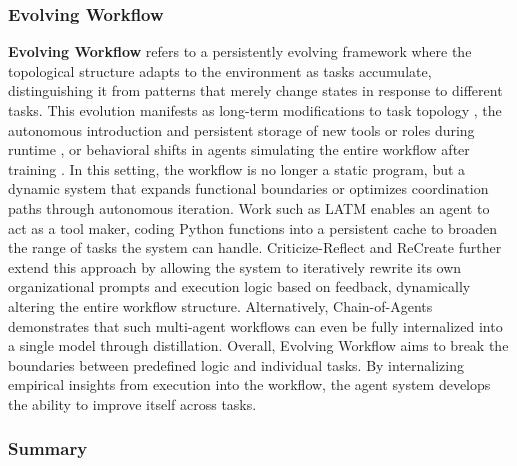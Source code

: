 \documentclass{llmxive}
\begin{document}
\subsubsection{Evolving Workflow}
\label{sec:evolving_workflow}
\textbf{Evolving Workflow} refers to a persistently evolving framework where the topological structure adapts to the environment as tasks accumulate, distinguishing it from patterns that merely change states in response to different tasks. This evolution manifests as long-term modifications to task topology \cite{MUSE, ReCreate, Criticize_Reflect, GPTSwarm}, the autonomous introduction and persistent storage of new tools or roles during runtime \cite{Yunjue_Agent, STEVE}, or behavioral shifts in agents simulating the entire workflow after training \cite{Chain-of-Agents, ReasonRAG}. In this setting, the workflow is no longer a static program, but a dynamic system that expands functional boundaries or optimizes coordination paths through autonomous iteration. Work such as LATM \cite{LATM} enables an agent to act as a tool maker, coding Python functions into a persistent cache to broaden the range of tasks the system can handle. Criticize-Reflect \cite{Criticize_Reflect} and ReCreate \cite{ReCreate} further extend this approach by allowing the system to iteratively rewrite its own organizational prompts and execution logic based on feedback, dynamically altering the entire workflow structure. Alternatively, Chain-of-Agents \cite{Chain-of-Agents} demonstrates that such multi-agent workflows can even be fully internalized into a single model through distillation. Overall, Evolving Workflow aims to break the boundaries between predefined logic and individual tasks. By internalizing empirical insights from execution into the workflow, the agent system develops the ability to improve itself across tasks.

\subsubsection{Summary}
\end{document}
